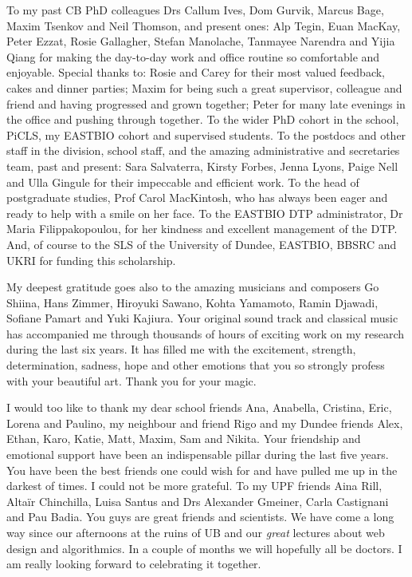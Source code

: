 To my past CB PhD colleagues Drs Callum Ives, Dom Gurvik, Marcus Bage, Maxim Tsenkov and Neil Thomson, and present ones: Alp Tegin, Euan MacKay, Peter Ezzat, Rosie Gallagher, Stefan Manolache, Tanmayee Narendra and Yijia Qiang for making the day-to-day work and office routine so comfortable and enjoyable. Special thanks to: Rosie and Carey for their most valued feedback, cakes and dinner parties; Maxim for being such a great supervisor, colleague and friend and having progressed and grown together; Peter for many late evenings in the office and pushing through together. To the wider PhD cohort in the school, PiCLS, my EASTBIO cohort and supervised students. To the postdocs and other staff in the division, school staff, and the amazing administrative and secretaries team, past and present: Sara Salvaterra, Kirsty Forbes, Jenna Lyons, Paige Nell and Ulla Gingule for their impeccable and efficient work. To the head of postgraduate studies, Prof Carol MacKintosh, who has always been eager and ready to help with a smile on her face. To the EASTBIO DTP administrator, Dr Maria Filippakopoulou, for her kindness and excellent management of the DTP. And, of course to the SLS of the University of Dundee, EASTBIO, BBSRC and UKRI for funding this scholarship.

My deepest gratitude goes also to the amazing musicians and composers Go Shiina, Hans Zimmer, Hiroyuki Sawano, Kohta Yamamoto, Ramin Djawadi, Sofiane Pamart and Yuki Kajiura. Your original sound track and classical music has accompanied me through thousands of hours of exciting work on my research during the last six years. It has filled me with the excitement, strength, determination, sadness, hope and other emotions that you so strongly profess with your beautiful art. Thank you for your magic.

I would too like to thank my dear school friends Ana, Anabella, Cristina, Eric, Lorena and Paulino, my neighbour and friend Rigo and my Dundee friends Alex, Ethan, Karo, Katie, Matt, Maxim, Sam and Nikita. Your friendship and emotional support have been an indispensable pillar during the last five years. You have been the best friends one could wish for and have pulled me up in the darkest of times. I could not be more grateful. To my UPF friends Aina Rill, Altaïr Chinchilla, Luisa Santus and Drs Alexander Gmeiner, Carla Castignani and Pau Badia. You guys are great friends and scientists. We have come a long way since our afternoons at the ruins of UB and our \textit{great} lectures about web design and algorithmics. In a couple of months we will hopefully all be doctors. I am really looking forward to celebrating it together.

